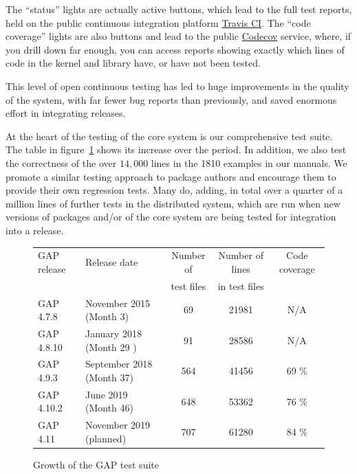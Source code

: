 The ``status'' lights are actually active buttons, which lead to the
full test reports, held on the public continuous integration platform
\href{https://travis-ci.org/}{Travis CI}. The ``code coverage''
lights are also buttons and lead to the public
\href{https://codecov.io/}{Codecov} service, where, if you drill down far
enough, you can access reports showing exactly which lines of code in the kernel
and library have, or have not been tested.

This level of open continuous testing has led to huge improvements in
the quality of the system, with far fewer bug reports than previously,
and saved enormous effort in integrating releases.

At the heart of the testing of the core \GAP system is our
comprehensive test suite. The table in
figure~\ref{fig:test-suite-growth} shows its increase over the period.
In addition, we also test the correctness of the
over $14,000$ lines in the 1810 examples in our manuals. We promote a similar testing approach to \GAP package authors and
encourage them to provide their own regression
tests. Many do, adding, in total over a quarter of a million lines of
further tests in the distributed system, which are run when new
versions of packages and/or of the core system are being tested for
integration into a release.


\begin{figure}[!ht]
\begin{center}
\begin{tabular}{| l | l | c | c | c |} 
\hline GAP release & Release date & Number of & Number of lines & Code
coverage \\ & & test files & in test files & \\ \hline GAP 4.7.8 &
November 2015 (Month 3) & 69 & 21981 & N/A \\ \hline GAP 4.8.10 &
January 2018 (Month 29 ) & 91 & 28586 & N/A \\ \hline GAP 4.9.3 &
September 2018 (Month 37) & 564 & 41456 & 69 \% \\ \hline GAP 4.10.2 &
June 2019 (Month 46) & 648 & 53362 & 76 \% \\ \hline GAP 4.11 &
November 2019 (planned) & 707 & 61280 & 84 \% \\ \hline
\end{tabular}
\caption{Growth of the GAP test suite}\label{fig:test-suite-growth}
\end{center}
\end{figure}

